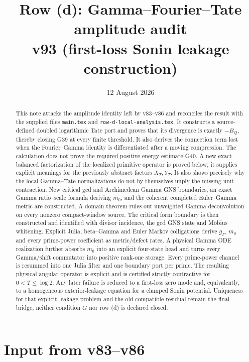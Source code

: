 \documentclass[11pt]{article}
\title{Row (d): Gamma--Fourier--Tate amplitude audit\\
v93 (first-loss Sonin leakage construction)}
\author{}
\date{12 August 2026}
\begin{document}
\maketitle

\begin{abstract}
This note attacks the amplitude identity left by v83--v86 and reconciles the
result with the supplied files \texttt{main.tex} and
\texttt{row-d-local-analysis.tex}.  It constructs a
source-defined doubled logarithmic Tate port and proves that its divergence is
exactly $-B_Q$, thereby closing G39 at every finite threshold.  It also derives
the connection term lost when the Fourier--Gamma identity is differentiated
after a moving compression.  The calculation does not prove the required
positive energy estimate G40.  A new exact balanced factorization of the
localized primitive operator is proved below; it supplies explicit meanings
for the previously abstract factors $X_T,Y_T$.  It also shows precisely why
the local Gamma--Tate normalizations do not by themselves imply the missing
unit contraction.  New critical gcd and Archimedean Gamma GNS boundaries,
an exact Gamma ratio--scale formula deriving $m_0$, and the coherent completed
Euler--Gamma metric are constructed.  A domain theorem rules out unweighted
Gamma deconvolution on every nonzero compact-window source.  The critical
form boundary is then constructed and identified with divisor incidence, the
gcd GNS state and M\"obius whitening.  Explicit Julia, beta--Gamma and Euler
Markov colligations derive $g_\Gamma$, $m_0$ and every prime-power coefficient
as metric/defect rates.  A physical Gamma ODE realization further absorbs
$m_0$ into an explicit four-state head and turns every Gamma/shift commutator
into positive rank-one storage.  Every prime-power channel is resummed into
one Julia filter and one boundary port per prime.  The resulting physical
angular operator is explicit and is certified strictly contractive for
$0<T\le\log2$.  Any later failure is reduced to a first-loss zero mode and,
equivalently, to a homogeneous exterior-leakage equation for a clamped Sonin
potential.  Uniqueness for that explicit leakage problem and the
old-compatible residual remain the final bridge; neither condition $G$ nor
row (d) is declared closed.
\end{abstract}

\section{Input from v83--v86}
\end{document}
